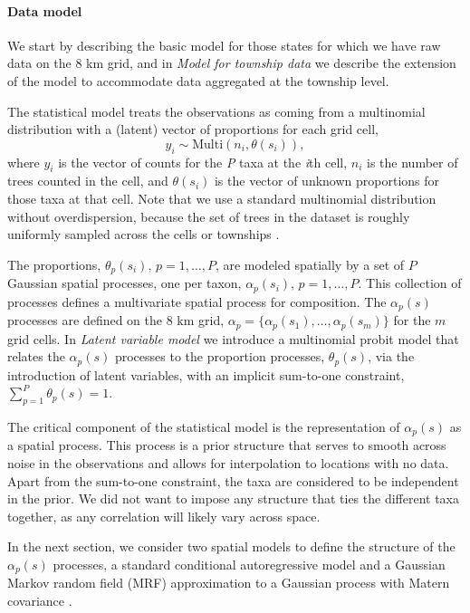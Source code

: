 \documentclass[10pt,letterpaper]{article}
\begin{document}
\paragraph*{Data model}

We start by describing the basic model for those states for which
we have raw data on the 8 km grid, and in \emph{Model for township data}
we describe the extension of the model to accommodate data aggregated
at the township level.

The statistical model treats the observations as coming from a multinomial
distribution with a (latent) vector of proportions for each grid cell,
\[
y_{i}\sim\mbox{Multi}(n_{i},\theta(s_{i})),
\]
where $y_{i}$ is the vector of counts for the \emph{P} taxa at the \emph{i}th
cell, $n_{i}$ is the number of trees counted in the cell, and $\theta(s_{i})$
is the vector of unknown proportions for those taxa at that cell.
Note that we use a standard multinomial distribution without overdispersion,
because the set of trees in the dataset is roughly uniformly sampled
across the cells or townships \cite{goring2015composition}.

The proportions, $\theta_{p}(s_{i}),\, p=1,\ldots,P$, are modeled
spatially by a set of $P$ Gaussian spatial processes, one per taxon,
$\alpha_{p}(s_{i}),\, p=1,\ldots,P$. This collection of processes
defines a multivariate spatial process for composition. The $\alpha_{p}(s)$
processes are defined on the 8 km grid, $\alpha_{p}=\{\alpha_{p}(s_{1}),\ldots,\alpha_{p}(s_{m})\}$
for the $m$ grid cells. In \emph{Latent variable model}
we introduce a multinomial probit model that relates the $\alpha_{p}(s)$
processes to the proportion processes, $\theta_{p}(s)$, via the introduction
of latent variables, with an implicit sum-to-one constraint, $\sum_{p=1}^{P}\theta_{p}(s)=1$.



The critical component of the statistical model is the representation
of $\alpha_{p}(s)$ as a spatial process. This process is a prior
structure that serves to smooth across noise in the observations and
allows for interpolation to locations with no data. Apart from the
sum-to-one constraint, the taxa are considered to be independent in
the prior. We did not want to impose any structure that ties the different
taxa together, as any correlation will likely vary across space.

In the next section, we consider two spatial models to define the
structure of the $\alpha_{p}(s)$ processes, a standard conditional
autoregressive model \cite{Bane:etal:2004} and a Gaussian Markov
random field (MRF) approximation to a Gaussian process with Matern
covariance \cite{Lind:etal:2011}. 
\end{document}
